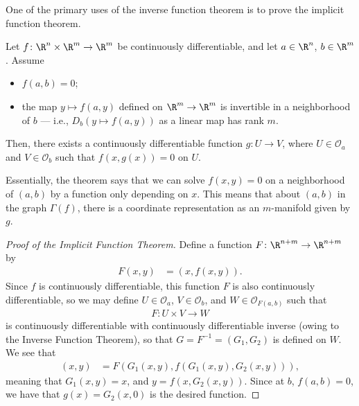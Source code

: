 \documentclass[10pt]{mypackage}
\begin{document}
One of the primary uses of the inverse function theorem is to prove the implicit function theorem. 
\begin{theorem}
  Let $f\colon \R^{n}\times \R^{m}\rightarrow \R^{m}$ be continuously differentiable, and let $a\in \R^{n}$, $b\in \R^{m}$. Assume
  \begin{itemize}
    \item $f(a,b) = 0$;
    \item the map $y\mapsto f\left( a,y \right)$ defined on $\R^{m}\rightarrow \R^{m}$ is invertible in a neighborhood of $b$ --- i.e., $D_b\left( y\mapsto f\left( a,y \right) \right)$ as a linear map has rank $m$.
  \end{itemize}
  Then, there exists a continuously differentiable function $g\colon U\rightarrow V$, where $U\in \mathcal{O}_{a}$ and $V\in \mathcal{O}_b$ such that $f\left( x,g(x) \right) = 0$ on $U$.
\end{theorem}
Essentially, the theorem says that we can solve $f\left( x,y \right) = 0$ on a neighborhood of $\left( a,b \right)$ by a function only depending on $x$. This means that about $\left( a,b \right)$ in the graph $\Gamma\left( f \right)$, there is a coordinate representation as an $m$-manifold given by $g$.
\begin{proof}[Proof of the Implicit Function Theorem]
  Define a function $F\colon \R^{n+m}\rightarrow \R^{n+m}$ by
  \begin{align*}
    F(x,y) &= \left( x,f\left( x,y \right) \right).
  \end{align*}
  Since $f$ is continuously differentiable, this function $F$ is also continuously differentiable, so we may define $U\in \mathcal{O}_a$, $V\in \mathcal{O}_b$, and $W\in \mathcal{O}_{F\left( a,b \right)}$ such that
  \begin{align*}
    F\colon U\times V \rightarrow W
  \end{align*}
  is continuously differentiable with continuously differentiable inverse (owing to the Inverse Function Theorem), so that $G = F^{-1} = \left( G_1,G_2 \right)$ is defined on $W$. We see that
  \begin{align*}
    \left( x,y \right) &= F\left( G_1\left( x,y \right),f\left( G_1\left( x,y \right),G_2\left( x,y \right) \right) \right),
  \end{align*}
  meaning that $G_1\left( x,y \right) = x$, and $y = f\left( x,G_2\left( x,y \right) \right)$. Since at $b$, $f\left( a,b \right) = 0$, we have that $g(x) = G_2\left( x,0 \right)$ is the desired function.
\end{proof}
\end{document}

